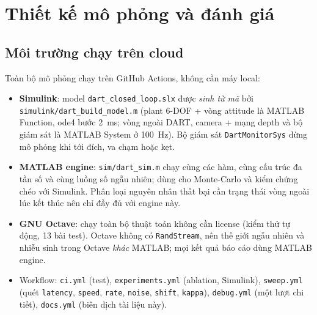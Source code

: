 \documentclass[11pt,a4paper]{article}
\numberwithin{equation}{section}
\newcommand{\code}[1]{\texttt{\small #1}}
\theoremstyle{definition}
\theoremstyle{plain}
\theoremstyle{remark}
\begin{document}
\section{Thiết kế mô phỏng và đánh giá}
\label{sec:eval}

\subsection{Môi trường chạy trên cloud}
Toàn bộ mô phỏng chạy trên GitHub Actions, không cần máy local:
\begin{itemize}
\item \textbf{Simulink}: model \code{dart\_closed\_loop.slx} được \emph{sinh từ mã} bởi \code{simulink/dart\_build\_model.m} (plant 6-DOF + vòng attitude là MATLAB Function, ode4 bước 2~ms; vòng ngoài DART, camera + mạng depth và bộ giám sát là MATLAB System ở 100~Hz). Bộ giám sát \code{DartMonitorSys} dừng mô phỏng khi tới đích, va chạm hoặc kẹt.
\item \textbf{MATLAB engine}: \code{sim/dart\_sim.m} chạy cùng các hàm, cùng cấu trúc đa tần số và cùng luồng số ngẫu nhiên; dùng cho Monte-Carlo và kiểm chứng chéo với Simulink. Phân loại nguyên nhân thất bại cần trạng thái vòng ngoài lúc kết thúc nên chỉ đầy đủ với engine này.
\item \textbf{GNU Octave}: chạy toàn bộ thuật toán không cần license (kiểm thử tự động, 13 bài test). Octave không có \code{RandStream}, nên thế giới ngẫu nhiên và nhiễu sinh trong Octave \emph{khác} MATLAB; mọi kết quả báo cáo dùng MATLAB engine.
\item Workflow: \code{ci.yml} (test), \code{experiments.yml} (ablation, Simulink), \code{sweep.yml} (quét \code{latency}, \code{speed}, \code{rate}, \code{noise}, \code{shift}, \code{kappa}), \code{debug.yml} (một lượt chi tiết), \code{docs.yml} (biên dịch tài liệu này).
\end{itemize}
\end{document}
